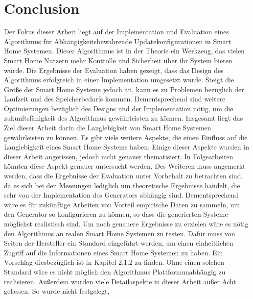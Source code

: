 \chapter{Conclusion}
Der Fokus dieser Arbeit liegt auf der Implementation und Evaluation eines Algorithmus für Abhängigkeitsbewahrende
Updatekonfigurationen in Smart Home Systemen. Dieser Algorithmus ist in der Theorie ein Werkzeug, das vielen Smart
Home Nutzern mehr Kontrolle und Sicherheit über ihr System bieten würde.
Die Ergebnisse der Evaluation haben gezeigt, dass das Design des Algorithmus erfolgreich in einer Implementation
umgesetzt wurde. Steigt die Größe der Smart Home Systeme jedoch an, kann es zu 
Problemen bezüglich der Laufzeit und des Speicherbedarfs kommen. Dementsprechend sind weitere Optimierungen bezüglich des Designs
und der Implementation nötig, um die zukunftsfähigkeit des Algorithmus gewährleisten zu können.
Insgesamt liegt das Ziel dieser Arbeit darin die Langlebigkeit von Smart Home Systemen
gewährleisten zu können. Es gibt viele weitere Aspekte, die einen Einfluss auf die Langlebigkeit eines Smart Home Systems
haben. Einige dieser Aspekte wurden in dieser Arbeit angerissen, jedoch nicht genauer thematisiert. In Folgearbeiten könnten
diese Aspekt genauer untersucht werden. Des Weiteren muss angemerkt werden, dass die Ergebnisse der Evaluation unter
Vorbehalt zu betrachten sind, da es sich bei den Messungen lediglich um theoretische Ergebnisse handelt, die sehr von der
Implementation des Generators abhängig sind. Dementsprechend wäre es für zukünftige Arbeiten von Vorteil empirische Daten
zu sammeln, um den Generator so konfigurieren zu können, so dass die generierten Systeme möglichst realistisch sind. Um noch
genauere Ergebnisse zu erzielen wäre es nötig den Algorithmus an realen Smart Home Systemen zu testen. Dafür muss von Seiten
der Hersteller ein Standard eingeführt werden, um einen einheitlichen Zugriff auf die Informationen eines Smart Home Systemen zu
haben. Ein Vorschlag diesbezüglich ist in Kapitel 2.1.2 zu finden. Ohne einen solchen Standard wäre es nicht möglich den Algorithmus
Plattformunabhängig zu realisieren. Außerdem wurden viele Detailaspekte in dieser Arbeit außer Acht gelassen. So wurde nicht
festgelegt, 




